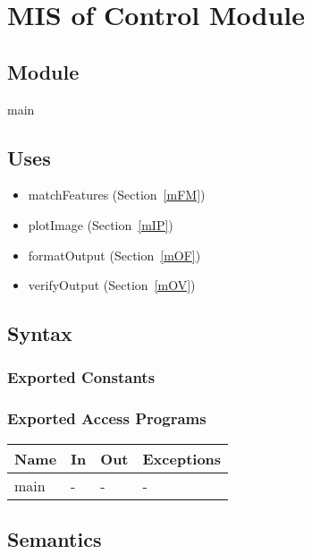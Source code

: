 \documentclass[12pt, titlepage]{article}
\begin{document}
  \section{MIS of Control Module} \label{mC}



\subsection{Module}

main

\subsection{Uses}
\begin{itemize}
  \item matchFeatures (Section~\ref{mFM})
  \item plotImage (Section~\ref{mIP})
  \item formatOutput (Section~\ref{mOF})
  \item verifyOutput (Section~\ref{mOV})
\end{itemize}

\subsection{Syntax}

\subsubsection{Exported Constants}

\subsubsection{Exported Access Programs}

\begin{center}
\begin{tabular}{p{2cm} p{4cm} p{4cm} p{2cm}}
\hline
\textbf{Name} & \textbf{In} & \textbf{Out} & \textbf{Exceptions} \\
\hline
main & - & - & - \\
\hline
\end{tabular}
\end{center}

\subsection{Semantics}
\end{document}

